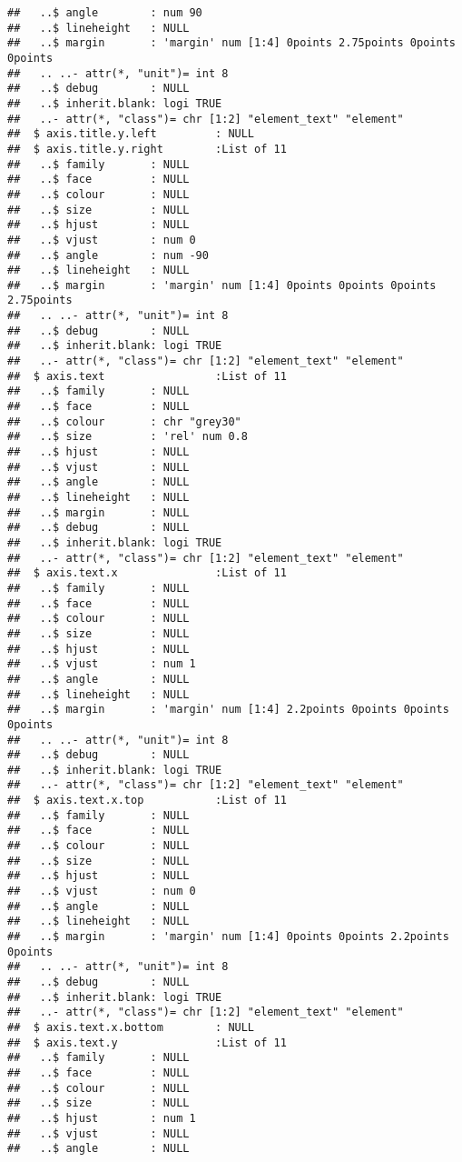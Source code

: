 \documentclass[
]{article}
\begin{document}
\begin{verbatim}
##   ..$ angle        : num 90
##   ..$ lineheight   : NULL
##   ..$ margin       : 'margin' num [1:4] 0points 2.75points 0points 0points
##   .. ..- attr(*, "unit")= int 8
##   ..$ debug        : NULL
##   ..$ inherit.blank: logi TRUE
##   ..- attr(*, "class")= chr [1:2] "element_text" "element"
##  $ axis.title.y.left         : NULL
##  $ axis.title.y.right        :List of 11
##   ..$ family       : NULL
##   ..$ face         : NULL
##   ..$ colour       : NULL
##   ..$ size         : NULL
##   ..$ hjust        : NULL
##   ..$ vjust        : num 0
##   ..$ angle        : num -90
##   ..$ lineheight   : NULL
##   ..$ margin       : 'margin' num [1:4] 0points 0points 0points 2.75points
##   .. ..- attr(*, "unit")= int 8
##   ..$ debug        : NULL
##   ..$ inherit.blank: logi TRUE
##   ..- attr(*, "class")= chr [1:2] "element_text" "element"
##  $ axis.text                 :List of 11
##   ..$ family       : NULL
##   ..$ face         : NULL
##   ..$ colour       : chr "grey30"
##   ..$ size         : 'rel' num 0.8
##   ..$ hjust        : NULL
##   ..$ vjust        : NULL
##   ..$ angle        : NULL
##   ..$ lineheight   : NULL
##   ..$ margin       : NULL
##   ..$ debug        : NULL
##   ..$ inherit.blank: logi TRUE
##   ..- attr(*, "class")= chr [1:2] "element_text" "element"
##  $ axis.text.x               :List of 11
##   ..$ family       : NULL
##   ..$ face         : NULL
##   ..$ colour       : NULL
##   ..$ size         : NULL
##   ..$ hjust        : NULL
##   ..$ vjust        : num 1
##   ..$ angle        : NULL
##   ..$ lineheight   : NULL
##   ..$ margin       : 'margin' num [1:4] 2.2points 0points 0points 0points
##   .. ..- attr(*, "unit")= int 8
##   ..$ debug        : NULL
##   ..$ inherit.blank: logi TRUE
##   ..- attr(*, "class")= chr [1:2] "element_text" "element"
##  $ axis.text.x.top           :List of 11
##   ..$ family       : NULL
##   ..$ face         : NULL
##   ..$ colour       : NULL
##   ..$ size         : NULL
##   ..$ hjust        : NULL
##   ..$ vjust        : num 0
##   ..$ angle        : NULL
##   ..$ lineheight   : NULL
##   ..$ margin       : 'margin' num [1:4] 0points 0points 2.2points 0points
##   .. ..- attr(*, "unit")= int 8
##   ..$ debug        : NULL
##   ..$ inherit.blank: logi TRUE
##   ..- attr(*, "class")= chr [1:2] "element_text" "element"
##  $ axis.text.x.bottom        : NULL
##  $ axis.text.y               :List of 11
##   ..$ family       : NULL
##   ..$ face         : NULL
##   ..$ colour       : NULL
##   ..$ size         : NULL
##   ..$ hjust        : num 1
##   ..$ vjust        : NULL
##   ..$ angle        : NULL

\end{verbatim}
\end{document}
